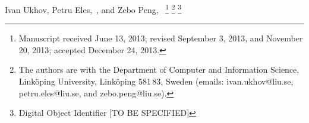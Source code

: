 Ivan Ukhov, Petru Eles,~, and Zebo Peng,~%
\thanks{Manuscript received June 13, 2013; revised September 3, 2013, and November 20, 2013; accepted December 24, 2013.}%
\thanks{The authors are with the Department of Computer and Information Science, Link\"{o}ping University, Link\"{o}ping 581\,83, Sweden (emails: ivan.ukhov@liu.se, petru.eles@liu.se, and zebo.peng@liu.se).}%
\thanks{Digital Object Identifier [TO BE SPECIFIED]}%
